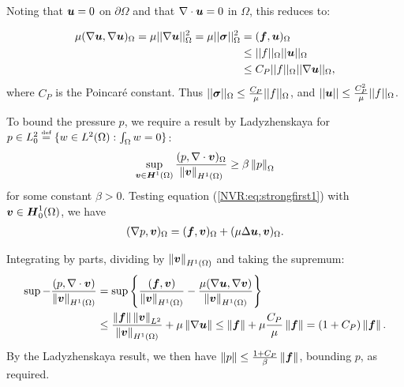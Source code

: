 Noting that $\vect{u} = 0$ on $\partial \Omega$ and that $\NVRdiv \vect{u} = 0 $ in $\Omega$, this reduces to:

\begin{align*}
\mu (\NVRgrad \vect{u}, \NVRgrad \vect{u})_{\Omega} = \mu ||\NVRgrad \vect{u}||^{2}_{\Omega} = \mu || \NVRtensor{ \sigma }||^{2}_{\Omega} &= (\vect{f},\vect{u})_{\Omega} \\
&\leq || f ||_{\Omega} || \vect{u} ||_{\Omega}\\
&\leq C_{P} || f ||_{\Omega} || \NVRgrad \vect{u} ||_{\Omega},
\end{align*}
where $C_{P}$ is the Poincar\'{e} constant.  Thus $ || \NVRtensor{ \sigma }||_{\Omega} \leq \frac{C_{P}}{\mu} || f ||_{\Omega}$, and $|| \vect{u} || \leq \frac{C_{P}^{2}}{\mu} || f ||_{\Omega}$.

To bound the pressure $p$, we require a result by Ladyzhenskaya \cite{Ladyzhenskaya} for $p \in L^{2}_{0} \NVReqdef \{w \in L^{2}(\Omega) : \int_{\Omega} w = 0 \}$:
\begin{align*}
\sup_{\vect{v} \in \vect{H}^{1}(\Omega)} \frac{(p, \NVRdiv \vect{v})_{\Omega}}{\norm{ \vect{v} }_{H^{1}(\Omega)} } \geq \beta \norm{p}_{\Omega}
\end{align*}
for some constant $\beta > 0$.  Testing equation (\ref{NVR:eq:strongfirst1}) with $\vect{v} \in \vect{H}^{1}_{0}(\Omega)$, we have
\begin{align*}
(\NVRgrad p, \vect{v})_{\Omega} = (\vect{f}, \vect{v})_{\Omega} + (\mu \Delta \vect{u}, \vect{v})_{\Omega}.
\end{align*}

Integrating by parts, dividing by $\norm{ \vect{v} }_{H^{1}(\Omega)}$ and taking the supremum:
\begin{align*}
\sup - \frac{(p, \NVRdiv \vect{v})}{\norm{ \vect{v} }_{H^{1}(\Omega)}} &= \sup \left\{\frac{(\vect{f}, \vect{v})}{\norm{ \vect{v} }_{H^{1}(\Omega)}} - \frac{\mu (\NVRgrad \vect{u}, \NVRgrad \vect{v})}{\norm{ \vect{v} }_{H^{1}(\Omega)}}\right\} \\
&\leq \frac{\norm{\vect{f}} \norm{\vect{v}}_{L^{2}}}{\norm{ \vect{v} }_{H^{1}(\Omega)}} + \mu \norm{\NVRgrad \vect{u}} \leq \norm{\vect{f} } + \mu \frac{C_{P}}{\mu} \norm{\vect{f}} = (1 + C_{P}) \norm{\vect{f}}.
\end{align*}
By the Ladyzhenskaya result, we then have $\norm{p} \leq \frac{1 + C_{P}}{\beta} \norm{\vect{f}}$, bounding $p$, as required.

